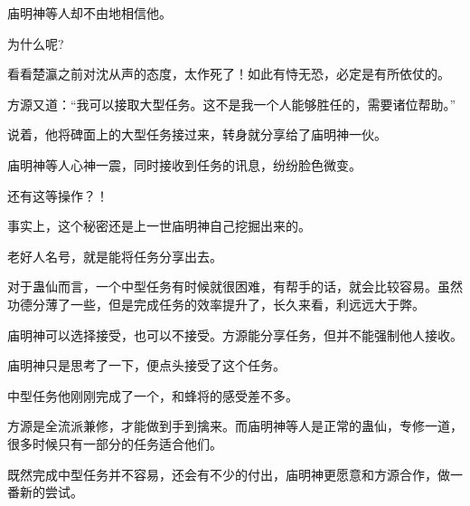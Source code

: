 \begin{this_body}
庙明神等人却不由地相信他。

为什么呢?

看看楚瀛之前对沈从声的态度，太作死了！如此有恃无恐，必定是有所依仗的。

方源又道：“我可以接取大型任务。这不是我一个人能够胜任的，需要诸位帮助。”

说着，他将碑面上的大型任务接过来，转身就分享给了庙明神一伙。

庙明神等人心神一震，同时接收到任务的讯息，纷纷脸色微变。

还有这等操作？！

事实上，这个秘密还是上一世庙明神自己挖掘出来的。

老好人名号，就是能将任务分享出去。

对于蛊仙而言，一个中型任务有时候就很困难，有帮手的话，就会比较容易。虽然功德分薄了一些，但是完成任务的效率提升了，长久来看，利远远大于弊。

庙明神可以选择接受，也可以不接受。方源能分享任务，但并不能强制他人接收。

庙明神只是思考了一下，便点头接受了这个任务。

中型任务他刚刚完成了一个，和蜂将的感受差不多。

方源是全流派兼修，才能做到手到擒来。而庙明神等人是正常的蛊仙，专修一道，很多时候只有一部分的任务适合他们。

既然完成中型任务并不容易，还会有不少的付出，庙明神更愿意和方源合作，做一番新的尝试。

\end{this_body}

